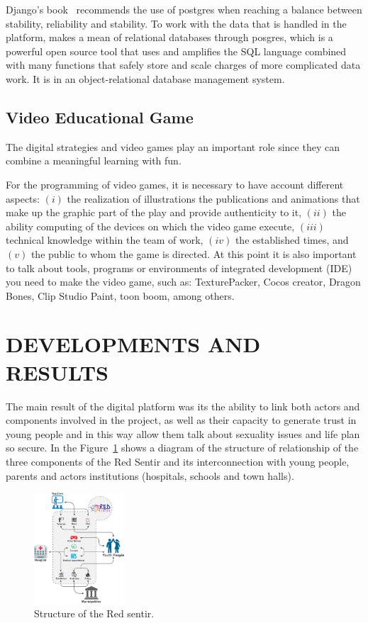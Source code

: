 \documentclass[journal,transmag]{IEEEtran}
\begin{document}
Django's book~\cite{DjangoM} recommends the use of postgres when reaching a balance between stability, reliability and stability. To work with the data that is handled in the platform, makes a mean of relational databases through posgres, which is a powerful open source tool that uses and amplifies the SQL language combined with many functions that safely store and scale charges of more complicated data work. It is in an object-relational database management system.

\subsection{Video Educational Game}\label{videojuego}
The digital strategies and video games play an important role since they can combine a meaningful learning with fun.

For the programming of video games, it is necessary to have account different aspects: $(i)$ the realization of illustrations the publications and animations that make up the graphic part of the play and provide authenticity to it, $(ii)$ the ability computing of the devices on which the video game execute, $(iii)$ technical knowledge within the team of work, $(iv)$ the established times, and $(v)$ the public to whom the game is directed. At this point it is also important to talk about tools, programs or environments of integrated development (IDE) you need to make the video game, such as: TexturePacker, Cocos creator, Dragon Bones, Clip Studio Paint, toon boom, among others.

\section{DEVELOPMENTS AND RESULTS}\label{sec:resultados}

The main result of the digital platform was its the ability to link both actors and components involved in the project, as well as their capacity to generate trust in young people and in this way allow them talk about sexuality issues and life plan so secure. In the Figure~\ref{fig:estructura} shows a diagram of the structure of relationship of the three components of the Red Sentir and its interconnection with young people, parents and actors institutions (hospitals, schools and town halls). 

\begin{figure}[t]
\centering
\includegraphics[width=0.3\textwidth]{Digital_Platform.png}
\caption{Structure of the Red sentir.}
\label{fig:estructura}
\end{figure}
 
\end{document}
